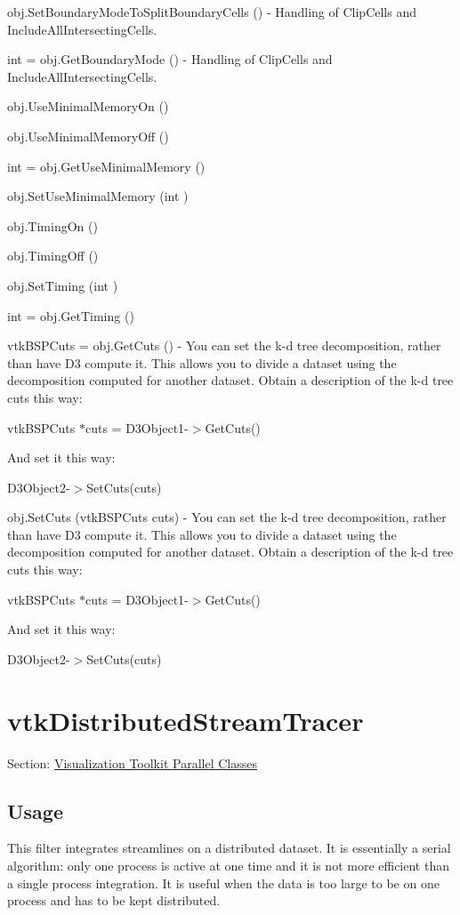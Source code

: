 \begin{DoxyItemize}
\item {\ttfamily obj.\-Set\-Boundary\-Mode\-To\-Split\-Boundary\-Cells ()} -\/ Handling of Clip\-Cells and Include\-All\-Intersecting\-Cells.  
\item {\ttfamily int = obj.\-Get\-Boundary\-Mode ()} -\/ Handling of Clip\-Cells and Include\-All\-Intersecting\-Cells.  
\item {\ttfamily obj.\-Use\-Minimal\-Memory\-On ()}  
\item {\ttfamily obj.\-Use\-Minimal\-Memory\-Off ()}  
\item {\ttfamily int = obj.\-Get\-Use\-Minimal\-Memory ()}  
\item {\ttfamily obj.\-Set\-Use\-Minimal\-Memory (int )}  
\item {\ttfamily obj.\-Timing\-On ()}  
\item {\ttfamily obj.\-Timing\-Off ()}  
\item {\ttfamily obj.\-Set\-Timing (int )}  
\item {\ttfamily int = obj.\-Get\-Timing ()}  
\item {\ttfamily vtk\-B\-S\-P\-Cuts = obj.\-Get\-Cuts ()} -\/ You can set the k-\/d tree decomposition, rather than have D3 compute it. This allows you to divide a dataset using the decomposition computed for another dataset. Obtain a description of the k-\/d tree cuts this way\-:

vtk\-B\-S\-P\-Cuts $\ast$cuts = D3\-Object1-\/$>$Get\-Cuts()

And set it this way\-:

D3\-Object2-\/$>$Set\-Cuts(cuts)  
\item {\ttfamily obj.\-Set\-Cuts (vtk\-B\-S\-P\-Cuts cuts)} -\/ You can set the k-\/d tree decomposition, rather than have D3 compute it. This allows you to divide a dataset using the decomposition computed for another dataset. Obtain a description of the k-\/d tree cuts this way\-:

vtk\-B\-S\-P\-Cuts $\ast$cuts = D3\-Object1-\/$>$Get\-Cuts()

And set it this way\-:

D3\-Object2-\/$>$Set\-Cuts(cuts)  
\end{DoxyItemize}\hypertarget{vtkparallel_vtkdistributedstreamtracer}{}\section{vtk\-Distributed\-Stream\-Tracer}\label{vtkparallel_vtkdistributedstreamtracer}
Section\-: \hyperlink{sec_vtkparallel}{Visualization Toolkit Parallel Classes} \hypertarget{vtkwidgets_vtkxyplotwidget_Usage}{}\subsection{Usage}\label{vtkwidgets_vtkxyplotwidget_Usage}
This filter integrates streamlines on a distributed dataset. It is essentially a serial algorithm\-: only one process is active at one time and it is not more efficient than a single process integration. It is useful when the data is too large to be on one process and has to be kept distributed.

